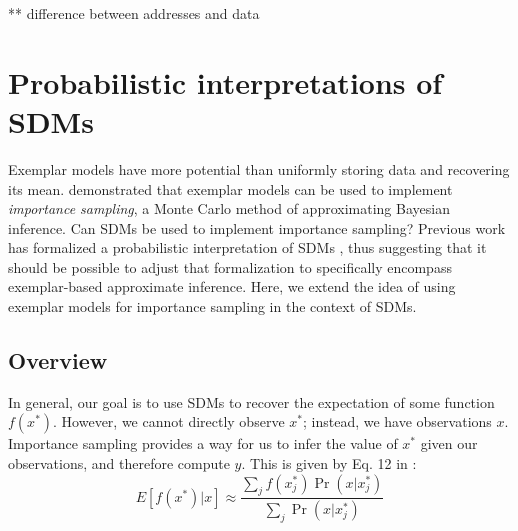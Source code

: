 \documentclass[10pt,letterpaper]{article}
\begin{document}


** difference between addresses and data \\



\section{Probabilistic interpretations of SDMs}


Exemplar models have more potential than uniformly storing data and
recovering its mean.  demonstrated that exemplar models
can be used to implement \textit{importance sampling}, a Monte Carlo
method of approximating Bayesian inference.  Can SDMs be used to
implement importance sampling? Previous work has formalized a
probabilistic interpretation of SDMs \cite{Anderson1989}, thus
suggesting that it should be possible to adjust that formalization to
specifically encompass exemplar-based approximate inference. Here, we
extend the idea of using exemplar models for importance sampling in
the context of SDMs.

\subsection{Overview}

In general, our goal is to use SDMs to recover the expectation of some
function $f(x^*)$. However, we cannot directly observe $x^*$; instead,
we have observations $x$. Importance sampling provides a way for us to
infer the value of $x^*$ given our observations, and therefore compute
$y$. This is given by Eq. 12 in :
\begin{equation}
E[f(x^*)|x]\approx \frac{\sum_j f(x_j^*)\Pr(x|x_j^*)}{\sum_j \Pr(x|x_j^*)}
\end{equation}
\end{document}

